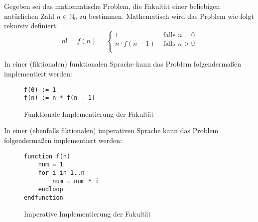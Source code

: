 		Gegeben sei das mathematische Problem, die Fakultät einer beliebigen natürlichen Zahl $ n \in \mathbb{N} _ 0 $ zu bestimmen. Mathematisch wird das Problem wie folgt rekursiv definiert:
		\begin{equation*}
			n! = f(n) = \begin{cases*}
				1 & \text{ falls } n = 0 \\
				n \cdot f(n - 1) & \text{ falls } n > 0 \\
			\end{cases*}
		\end{equation*}
		
		In einer (fiktionalen) funktionalen Sprache kann das Problem folgendermaßen implementiert werden:
		\begin{figure}[H]
			\centering
			\begin{lstlisting}
f(0) := 1
f(n) := n * f(n - 1)
			\end{lstlisting}
			\caption{Funktionale Implementierung der Fakultät}
		\end{figure}
		
		In einer (ebenfalls fiktionalen) imperativen Sprache kann das Problem folgendermaßen implementiert werden:
		\begin{figure}[H]
			\centering
			\begin{lstlisting}
function f(n)
	num = 1
	for i in 1..n
		num = num * i
	endloop
endfunction
			\end{lstlisting}
			\caption{Imperative Implementierung der Fakultät}
		\end{figure}

